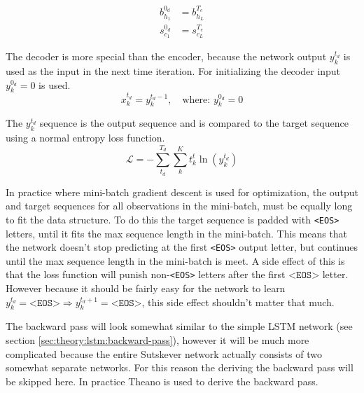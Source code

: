 \begin{equation}
\begin{aligned}
b_{h_1}^{0_d} &= b_{h_{L}}^{T_e} \\
s_{c_1}^{0_d} &= s_{c_{L}}^{T_e}
\end{aligned}
\end{equation}

The decoder is more special than the encoder, because the network output $y_k^{t_d}$ is used as the input in the next time iteration. For initializing the decoder input $y_k^{0_d} = 0$ is used.
\begin{equation}
x^{t_d}_k = y_k^{t_d - 1}, \quad \text{where: } y_k^{0_d} = 0
\end{equation}

The $y_k^{t_d}$ sequence is the output sequence and is compared to the target sequence using a normal entropy loss function.
\begin{equation}
\mathcal{L} = - \sum_{t_d}^{T_d} \sum_{k}^K t_k^t \ln(y_k^{t_d})
\end{equation}

In practice where mini-batch gradient descent is used for optimization, the output and target sequences for all observations in the mini-batch, must be equally long to fit the data structure. To do this the target sequence is padded with \texttt{<EOS>} letters, until it fits the max sequence length in the mini-batch. This means that the network doesn't stop predicting at the first \texttt{<EOS>} output letter, but continues until the max sequence  length in the mini-batch is meet. A side effect of this is that the loss function will punish non-\texttt{<EOS>} letters after the first $\texttt{<EOS>}$ letter. However because it should be fairly easy for the network to learn $y_k^{t_d} = \texttt{<EOS>} \Rightarrow y_k^{t_d+1} = \texttt{<EOS>}$, this side effect shouldn't matter that much.

The backward pass will look somewhat similar to the simple LSTM network (see section \ref{sec:theory:lstm:backward-pass}), however it will be much more complicated because the entire Sutskever network actually consists of two somewhat separate networks. For this reason the deriving the backward pass will be skipped here. In practice Theano \cite{theano-a, theano-b} is used to derive the backward pass.
